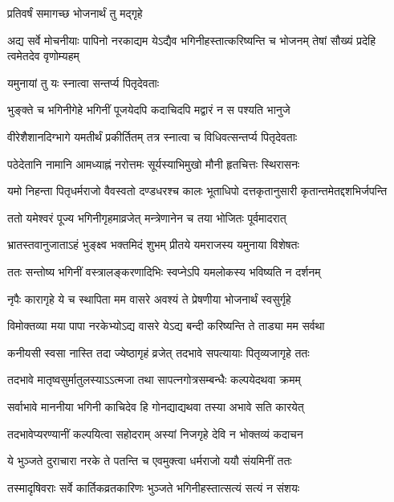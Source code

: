 
\onelineshloka
{प्रतिवर्षं समागच्छ भोजनार्थं तु मद्गृहे} %

\threelineshloka
{अद्य सर्वे मोचनीयाः पापिनो नरकाद्यम}
{येऽद्यैव भगिनीहस्तात्करिष्यन्ति च भोजनम्}
{तेषां सौख्यं प्रदेहि त्वमेतदेव वृणोम्यहम्} %



\onelineshloka
{यमुनायां तु यः स्नात्वा सन्तर्प्य पितृदेवताः} %

\twolineshloka
{भुङ्क्ते च भगिनीगेहे भगिनीं पूजयेदपि}
{कदाचिदपि मद्वारं न स पश्यति भानुजे} %

\twolineshloka
{वीरेशैशानदिग्भागे यमतीर्थं प्रकीर्तितम्}
{तत्र स्नात्वा च विधिवत्सन्तर्प्य पितृदेवताः} %

\twolineshloka
{पठेदेतानि नामानि आमध्याह्नं नरोत्तमः}
{सूर्यस्याभिमुखो मौनी हृतचित्तः स्थिरासनः} %

\fourlineindentedshloka
{यमो निहन्ता पितृधर्मराजो}
{वैवस्वतो दण्डधरश्च कालः}
{भूताधिपो दत्तकृतानुसारी}
{कृतान्तमेतद्दशभिर्जपन्ति} %

\twolineshloka
{ततो यमेश्वरं पूज्य भगिनीगृहमाव्रजेत्}
{मन्त्रेणानेन च तया भोजितः पूर्वमादरात्} %

\twolineshloka
{भ्रातस्तवानुजाताऽहं भुङ्क्ष्व भक्तमिदं शुभम्}
{प्रीतये यमराजस्य यमुनाया विशेषतः} %

\twolineshloka
{ततः सन्तोष्य भगिनीं वस्त्रालङ्करणादिभिः}
{स्वप्नेऽपि यमलोकस्य भविष्यति न दर्शनम्} %

\twolineshloka
{नृपैः कारागृहे ये च स्थापिता मम वासरे}
{अवश्यं ते प्रेषणीया भोजनार्थं स्वसुर्गृहे} %

\twolineshloka
{विमोक्तव्या मया पापा नरकेभ्योऽद्य वासरे}
{येऽद्य बन्दी करिष्यन्ति ते ताड्या मम सर्वथा} %

\twolineshloka
{कनीयसी स्वसा नास्ति तदा ज्येष्ठागृहं व्रजेत्}
{तदभावे सपत्यायाः पितृव्यजागृहे ततः} %

\twolineshloka
{तदभावे मातृष्वसुर्मातुलस्याऽऽत्मजा तथा}
{सापत्नगोत्रसम्बन्धैः कल्पयेदथवा क्रमम्} %

\twolineshloka
{सर्वाभावे माननीया भगिनी काचिदेव हि}
{गोनद्याद्यथवा तस्या अभावे सति कारयेत्} %

\twolineshloka
{तदभावेप्यरण्यानीं कल्पयित्वा सहोदराम्}
{अस्यां निजगृहे देवि न भोक्तव्यं कदाचन} %

\twolineshloka
{ये भुञ्जते दुराचारा नरके ते पतन्ति च}
{एवमुक्त्वा धर्मराजो ययौ संयमिनीं ततः} %

\twolineshloka
{तस्मादृषिवराः सर्वे कार्तिकव्रतकारिणः}
{भुञ्जते भगिनीहस्तात्सत्यं सत्यं न संशयः} %

